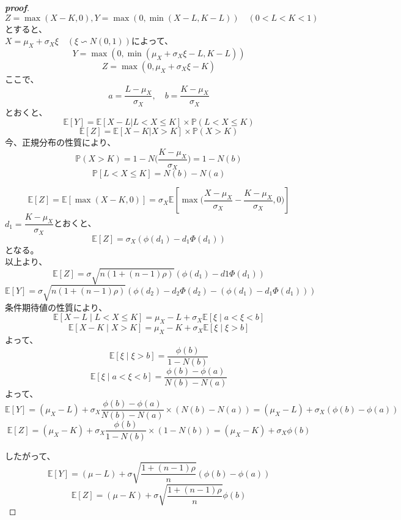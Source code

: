 \documentclass[a4paper,11pt]{jsarticle}
\begin{document}
\begin{proof}[\textbf{proof}]
$ Z = \max(X-K,0), Y = \max(0,\min(X-L,K-L))\quad ( 0<L<K<1) $とすると、\\
$ X = \mu_X + \sigma_X \xi\quad(\xi \backsim N(0,1))$によって、\\
$$ Y = \max(0,\min(\mu_X + \sigma_X \xi-L, K-L))$$
$$ Z = \max(0,\mu_X + \sigma_X \xi-K) $$
ここで、\\
$$ a=\dfrac{L-\mu_X}{\sigma_X},\quad b= \dfrac{K-\mu_X}{\sigma_X} $$
とおくと、\\
$$ \mathbb{E}[Y] = \mathbb{E}[X-L|L<X\leq K] \times \mathbb{P}(L<X\leq K) $$
$$ \mathbb{E}[Z]= \mathbb{E}[X-K|X>K] \times \mathbb{P}(X>K)$$
今、正規分布の性質により、\\
$$\mathbb{P}(X>K) = 1- N\Bigg(\dfrac{K-\mu_X}{\sigma_X}\Bigg) = 1 -N(b)$$
$$ \mathbb{P}[L<X\leq K] = N(b)- N(a)$$


$$ \mathbb{E}[Z] = \mathbb{E}[\max(X-K,0)] = \sigma_X \mathbb{E}[\max\Bigg(\dfrac{X-\mu_X}{\sigma_X}-\dfrac{K-\mu_X}{\sigma_X},0 \Bigg)]$$
$ d_1 = \dfrac{K-\mu_X}{\sigma_X} $とおくと、\\
$$ \mathbb{E}[Z] = \sigma_X (\phi (d_1)-d_1\Phi (d_1))$$
となる。\\
以上より、\\
$$ \mathbb{E}[Z] = \sigma \sqrt{n(1+(n-1)\rho)}(\phi(d_1)-d1\Phi(d_1)) $$
$$ \mathbb{E}[Y] = \sigma \sqrt{n(1+(n-1)\rho)}(\phi(d_2) - d_2\Phi(d_2) - (\phi(d_1)-d_1\Phi(d_1))) $$
条件期待値の性質により、\\
\[  
\mathbb{E}[X - L \mid L < X \leq K] = \mu_X - L + \sigma_X\mathbb{E}[\xi \mid a < \xi < b]  
\]  
\[  
\mathbb{E}[X - K \mid X > K] = \mu_X - K + \sigma_X\mathbb{E}[\xi \mid \xi > b]  
\]  
よって、\\
\[  
\mathbb{E}[\xi \mid \xi > b] = \frac{\phi(b)}{1 - N(b)}  
\]  
\[  
\mathbb{E}[\xi \mid a < \xi < b] = \frac{\phi(b) - \phi(a)}{N(b) - N(a)}  
\]  
よって、\\
\[  
\mathbb{E}[Y] = (\mu_X - L) + \sigma_X \frac{\phi(b) - \phi(a)}{N(b) - N(a)} \times (N(b) - N(a)) = (\mu_X - L) + \sigma_X(\phi(b) - \phi(a))  
\]  
\[  
\mathbb{E}[Z] = (\mu_X - K) + \sigma_X \frac{\phi(b)}{1 - N(b)} \times (1 - N(b)) = (\mu_X - K) + \sigma_X\phi(b)  
\]  

したがって、\\
\[  
\mathbb{E}[Y] = (\mu - L) + \sigma\sqrt{\frac{1 + (n-1)\rho}{n}}(\phi(b) - \phi(a))  
\]  
\[  
\mathbb{E}[Z] = (\mu - K) + \sigma\sqrt{\frac{1 + (n-1)\rho}{n}}\phi(b)  
\]  

\end{proof}
\end{document}
